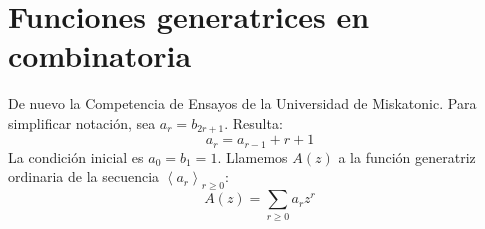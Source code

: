 \section{Funciones generatrices en combinatoria}
\label{sec:FG-combinatoria}

  De nuevo
  la Competencia de Ensayos de la Universidad de Miskatonic.
  Para simplificar notación,
  sea \(a_r = b_{2 r + 1}\).
  Resulta:
  \begin{equation}
    \label{eq:recurrence-UMEC-a-1}
    a_r
      = a_{r - 1} + r + 1
  \end{equation}
  La condición inicial es \(a_0 = b_1 = 1\).
  Llamemos \(A(z)\) a la función generatriz ordinaria
  de la secuencia \(\left\langle a_r\right\rangle_{r \ge 0}\):
  \begin{equation*}
    A(z)
      = \sum_{r \ge 0} a_r z^r
  \end{equation*}


